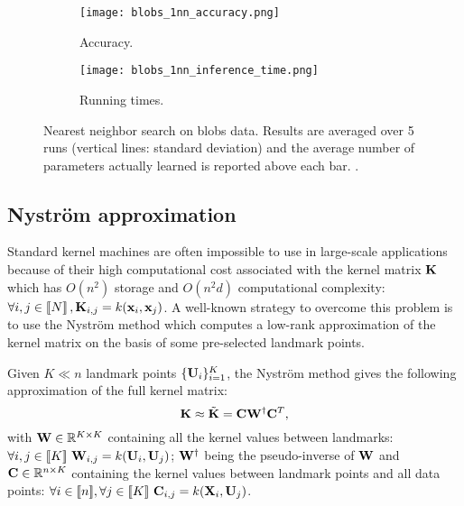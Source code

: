 \begin{figure}[tbh]
\centering
\begin{subfigure}[b]{.49\textwidth}
\texttt{[image: blobs\_1nn\_accuracy.png]}
\caption{Accuracy.}
\label{fig:nn:blobs:accuracy}
\end{subfigure}
\begin{subfigure}[b]{.49\textwidth}
\texttt{[image: blobs\_1nn\_inference\_time.png]}
\caption{Running times.}
\label{fig:nn:blobs:times}
\end{subfigure}
\caption{Nearest neighbor search on blobs data. Results are averaged over 5 runs (vertical lines: standard deviation) and the average number of parameters actually learned is reported above each bar. . }
\label{fig:nn:blobs}
\end{figure}

\subsection{Nyström approximation}

Standard kernel machines are often impossible to use in large-scale applications because of their high computational cost associated with the kernel matrix ${\mathbf{K}}$ which has $O(n^2)$ storage and $O(n^2d)$ computational complexity: $\forall i,j \in\left \llbracket N\right \rrbracket, {\mathbf{K}}_{i,j} = k({\mathbf{x}}_i, {\mathbf{x}}_j)$. A well-known strategy to overcome this problem is to use the Nyström method which computes a low-rank approximation of the kernel matrix on the basis of some pre-selected landmark points. 

Given $K \ll n$ landmark points $\{{\mathbf{U}}_i\}_{i=1}^{K}$, the Nyström method gives the following approximation of the full kernel matrix:
%
\begin{equation}
 \label{eq:nystrom}
 {\mathbf{K}} \approx \tilde{{\mathbf{K}}} = {\mathbf{C}}{\mathbf{W}}^\dagger{\mathbf{C}}^T,
\end{equation}
%
with ${\mathbf{W}} \in \mathbb{R}^{K \times K}$ containing all the kernel values between landmarks: $\forall i,j \in [\![K]\!]~ {\mathbf{W}}_{i,j} = k({\mathbf{U}}_i, {\mathbf{U}}_j)$; ${\mathbf{W}}^\dagger$ being the pseudo-inverse of ${\mathbf{W}}$ and ${\mathbf{C}} \in \mathbb{R}^{n \times K}$ containing the kernel values between landmark points and all data points: $\forall i \in [\![n]\!], \forall j \in [\![K]\!]~ {\mathbf{C}}_{i, j} = k({\mathbf{X}}_i, {\mathbf{U}}_j)$.

